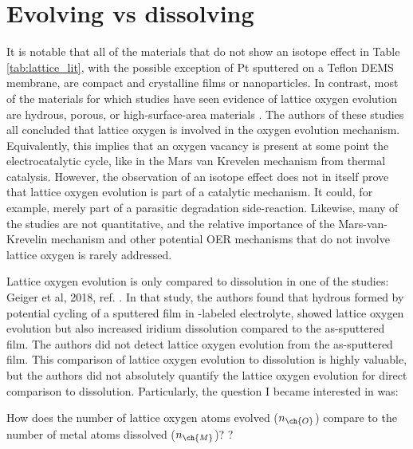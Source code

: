 
\section{Evolving vs dissolving}\label{sec:dissolving}

It is notable that all of the materials that do not show an isotope effect in Table \ref{tab:lattice_lit}, with the possible exception of Pt sputtered on a Teflon DEMS membrane\cite{Willsau1985}, are compact and crystalline films or nanoparticles\cite{Stoerzinger2017, Roy2018, Geiger2018}. In contrast, most of the materials for which studies have seen evidence of lattice oxygen evolution are hydrous, porous, or high-surface-area materials \cite{Wohlfahrt-Mehrens1987, Fierro2007, Surendranath2010, Amin2017, Grimaud2017, Geiger2018}. The authors of these studies all concluded that lattice oxygen is involved in the oxygen evolution mechanism. Equivalently, this implies that an oxygen vacancy is present at some point the electrocatalytic cycle, like in the Mars van Krevelen mechanism from thermal catalysis. However, the observation of an isotope effect does not in itself prove that lattice oxygen evolution is part of a catalytic mechanism. It could, for example, merely part of a parasitic degradation side-reaction. Likewise, many of the studies are not quantitative, and the relative importance of the Mars-van-Krevelin mechanism and other potential OER mechanisms that do not involve lattice oxygen is rarely addressed. 

Lattice oxygen evolution is only compared to dissolution in one of the studies: Geiger et al, 2018, ref. \cite{Geiger2018}. In that study, the authors found that hydrous  formed by potential cycling of a sputtered  film in -labeled electrolyte, showed lattice oxygen evolution but also increased iridium dissolution compared to the as-sputtered  film. The authors did not detect lattice oxygen evolution from the as-sputtered film. This comparison of lattice oxygen evolution to dissolution is highly valuable, but the authors did not absolutely quantify the lattice oxygen evolution for direct comparison to dissolution. Particularly, the question I became interested in was: 

\begin{question}
How does the number of lattice oxygen atoms evolved ($n_{\ch{O}}$) compare to the number of metal atoms dissolved ($n_{\ch{M}}$)?\label{q:O_vs_M}
?\end{question}

